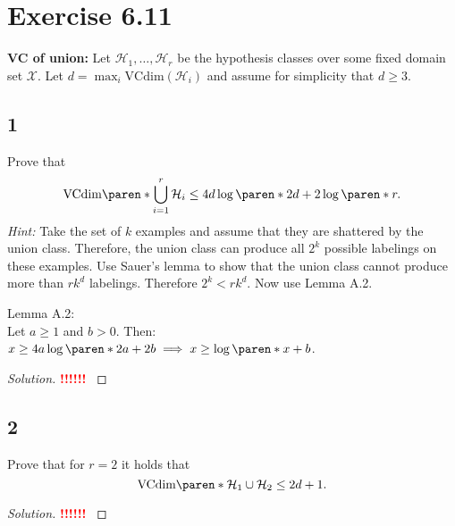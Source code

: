 \documentclass[10pt, a4paper, twoside]{amsart}
\DeclarePairedDelimiter\paren()
\newcommand{\cH}{\ensuremath{\mathcal{H}}}
\newcommand{\cX}{\ensuremath{\mathcal{X}}}
\newenvironment{solution}
               {\let\oldqedsymbol=\qedsymbol
                \renewcommand{\qedsymbol}{$\blacktriangleleft$}
                \begin{proof}[Solution]}
               {\end{proof}
                \renewcommand{\qedsymbol}{\oldqedsymbol}}
\newcommand{\TODO}{\textcolor{red}{\textbf{!!!!!! }}}
\begin{document}
\section*{Exercise 6.11}
\textbf{VC of union:} Let $\cH_1, \ldots , \cH_r$ be the hypothesis classes over some fixed domain set $\cX$. Let $d = \max_i \text{VCdim}(\cH_i)$ and assume for simplicity that $d \geq 3$.
\subsection*{1}
Prove that
\begin{equation*}
  \text{VCdim}\paren*{\bigcup_{i=1}^r\cH_i}\leq 4d \log \paren*{2d} + 2 \log \paren*{r}.
\end{equation*}
\textit{Hint:} Take the set of $k$ examples and assume that they are shattered by the union class. Therefore, the union class can produce all $2^k$ possible labelings on these examples. Use Sauer's lemma to show that the union class cannot produce more than $rk^d$  labelings. Therefore $2^k < rk^d$. Now use Lemma A.2.

Lemma A.2:\\
Let $a \geq 1$ and $b>0$. Then: $x \geq 4a \log \paren*{2a} +2b \implies x \geq \log \paren*{x}+b$.
\begin{solution}
\TODO
\end{solution}
\subsection*{2}
Prove that for $r = 2$ it holds that
\begin{equation*}
  \text{VCdim}\paren*{\cH_1 \cup \cH_2}\leq 2d +1.
\end{equation*}
\begin{solution}
\TODO
\end{solution}
\end{document}
